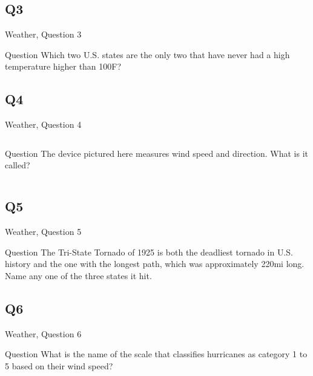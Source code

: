 \documentclass[11pt]{beamer}
\begin{document}
\subsection*{Q3}
\begin{frame}[t]{Weather, Question 3}
\begin{block}{Question}
Which two U.S. states are the only two that have never had a high temperature higher than 100\textdegree{}F\@?
\end{block}
\end{frame}
\subsection*{Q4}
\begin{frame}[t]{Weather, Question 4}
\begin{columns}[T,totalwidth=\linewidth]
\begin{column}{0.32\linewidth}
\begin{block}{Question}
The device pictured here measures wind speed and direction. What is it called?
\end{block}
\end{column}
\begin{column}{0.65\linewidth}
\begin{center}
\texttt{[image: \{Images/anemometer]}.jpg}
\end{center}
\end{column}
\end{columns}
\end{frame}
\subsection*{Q5}
\begin{frame}[t]{Weather, Question 5}
\begin{block}{Question}
The Tri-State Tornado of 1925 is both the deadliest tornado in U.S. history and the one with the longest path, which was approximately 220mi long. Name any one of the three states it hit.
\end{block}
\end{frame}
\subsection*{Q6}
\begin{frame}[t]{Weather, Question 6}
\begin{block}{Question}
What is the name of the scale that classifies hurricanes as category 1 to 5 based on their wind speed?
\end{block}
\end{frame}
\end{document}
